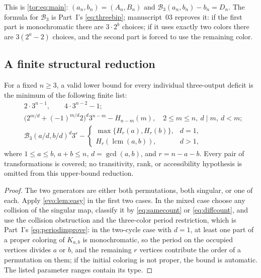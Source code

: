 \documentclass[11pt,a4paper]{article}
\numberwithin{equation}{section}
\theoremstyle{definition}
\theoremstyle{remark}
\newcommand{\lcm}{\operatorname{lcm}}
\newcommand{\Bip}{\mathcal B}
\begin{document}
This is \eqref{tor:eq:main}: $(a_n,b_n)=(A_n,B_n)$ and
$\Bip_3(a_n,b_n)-b_n=D_n$. The formula for $\Bip_3$ is Part~I's
\eqref{eq:threebip}; manuscript~03 reproves it: if the first part is
monochromatic there are $3\cdot2^b$ choices; if it uses exactly two colors
there are $3(2^a-2)$ choices, and the second part is forced to use the
remaining color.

\subsection{A finite structural reduction}

\begin{proposition}\label{evo:da:prop:finitebound}
For a fixed $n\ge3$, a valid lower bound for every individual three-output
deficit is the minimum of the following finite list:
\begin{align}
&2\cdot3^{n-1},\qquad4\cdot3^{n-2}-1;\label{evo:da:eq:candidates1}\\
&\bigl(2^{m/d}+(-1)^{m/d}2\bigr)^d3^{n-m}-H_{n-m}(m),
 \quad 2\le m\le n,\ d\mid m,\ d<m;\label{evo:da:eq:candidates2}\\
&\Bip_3(a/d,b/d)^d3^r-
 \begin{cases}
 \max\{H_r(a),H_r(b)\},&d=1,\\
 H_r(\lcm(a,b)),&d>1,
 \end{cases}\label{evo:da:eq:candidates3}
\end{align}
where $1\le a\le b$, $a+b\le n$, $d=\gcd(a,b)$, and $r=n-a-b$. Every pair of
transformations is covered; no transitivity, rank, or accessibility
hypothesis is omitted from this upper-bound reduction.
\end{proposition}
\begin{proof}
The two generators are either both permutations, both singular, or one of
each. Apply \cref{evo:lem:easy} in the first two cases. In the mixed case
choose any collision of the singular map, classify it by \eqref{eq:samecount}
or \eqref{eq:diffcount}, and use the collision obstruction and the
three-color period restriction, which is Part~I's \eqref{eq:periodimprove}:
in the two-cycle case with $d=1$, at least one part of a proper coloring of
$K_{a,b}$ is monochromatic, so the period on the occupied vertices divides
$a$ or $b$, and the remaining $r$ vertices contribute the order of a
permutation on them; if the initial coloring is not proper, the bound is
automatic. The listed parameter ranges contain its type.
\end{proof}
\end{document}
